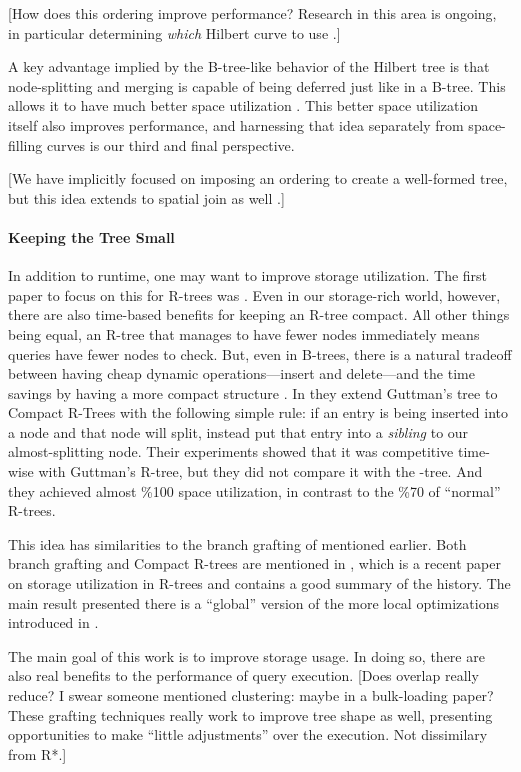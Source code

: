 [How does this ordering improve performance?
Research in this area is ongoing, in particular determining \emph{which} Hilbert curve to use \cite{haverkortwalderveen11}.]

A key advantage implied by the B-tree-like behavior of the Hilbert tree is that node-splitting and merging is capable of being deferred just like in a B-tree.
This allows it to have much better space utilization \cite{kamelfaloutsos94}.
This better space utilization itself also improves performance, and harnessing that idea separately from space-filling curves is our third and final perspective.

[We have implicitly focused on imposing an ordering to create a well-formed tree, but this idea extends to spatial join as well \cite{jacoxsamet07}.]

\paragraph{Keeping the Tree Small}
In addition to runtime, one may want to improve storage utilization.
The first paper to focus on this for R-trees was \cite{huanglinlin01}.
Even in our storage-rich world, however, there are also time-based benefits for keeping an R-tree compact.
All other things being equal, an R-tree that manages to have fewer nodes immediately means queries have fewer nodes to check.
But, even in B-trees, there is a natural tradeoff between having cheap dynamic operations---insert and delete---and the time savings by having a more compact structure \cite{...}.
In \cite{huanglinlin01} they extend Guttman's tree to Compact R-Trees with the following simple rule: if an entry is being inserted into a node and that node will split, instead put that entry into a \emph{sibling} to our almost-splitting node.
Their experiments showed that it was competitive time-wise with Guttman's R-tree, but they did not compare it with the \rstar-tree.
And they achieved almost \%100 space utilization, in contrast to the \%70 of ``normal'' R-trees.

This idea has similarities to the branch grafting of \cite{schrekchen00} mentioned earlier.
Both branch grafting and Compact R-trees are mentioned in \cite{zhanglucheng06}, which is a recent paper on storage utilization in R-trees and contains a good summary of the history.
The main result presented there is a ``global'' version of the more local optimizations introduced in \cite{huanglinlin01}.

The main goal of this work is to improve storage usage.
In doing so, there are also real benefits to the performance of query execution.
[Does overlap really reduce?
I swear someone mentioned clustering: maybe in a bulk-loading paper?
These grafting techniques really work to improve tree shape as well, presenting opportunities to make ``little adjustments'' over the execution.
Not dissimilary from R*.]

